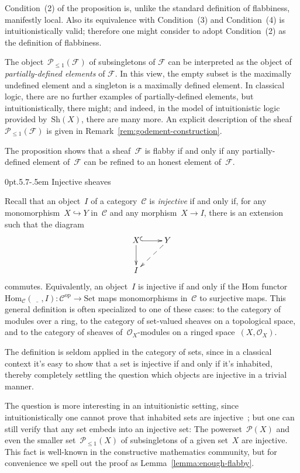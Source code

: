 \documentclass[10pt,reqno,a4paper]{amsbook}
\makeatletter
\theoremstyle{definition}
\theoremstyle{plain}
\theoremstyle{remark}
\newcommand{\C}{\mathcal{C}}
\newcommand{\F}{\mathcal{F}}
\renewcommand{\O}{\mathcal{O}}
\renewcommand{\P}{\mathcal{P}}
\newcommand{\Hom}{\mathrm{Hom}}
\newcommand{\placeholder}{\underline{\quad}}
\newcommand{\Set}{\mathrm{Set}}
\newcommand{\Sh}{\mathrm{Sh}}
\newcommand{\op}{\mathrm{op}}
\newcommand{\?}{\,{:}\,}
\renewcommand{\_}{\mathpunct{.}\,}
\def\subsection{\@startsection{subsection}{2}%
  {0pt}{.5\linespacing\@plus.7\linespacing}{-.5em}%
  {\normalfont\bfseries}}
\makeatother
\begin{document}
Condition~(2) of the proposition is, unlike the standard definition of flabbiness,
manifestly local. Also its equivalence with Condition~(3) and Condition~(4) is
intuitionistically valid; therefore one might consider to adopt Condition~(2) as
the definition of flabbiness.

The object~$\P_{\leq 1}(\F)$ of subsingletons of $\F$ can be
interpreted as the object of \emph{partially-defined
elements} of $\F$. In this view, the empty subset is the maximally undefined
element and a singleton is a maximally defined element. In classical logic,
there are no further examples of partially-defined elements, but
intuitionistically, there might; and indeed, in the model of intuitionistic
logic provided by~$\Sh(X)$, there are many more. An explicit description of the
sheaf~$\P_{\leq 1}(\F)$ is given in Remark~\ref{rem:godement-construction}.

The proposition shows that a sheaf~$\F$ is flabby if and only if any
partially-defined element of~$\F$ can be refined to an honest element of~$\F$.


\subsection{Injective sheaves}

Recall that an object~$I$ of a category~$\C$ is \emph{injective} if and only if,
for any monomorphism~$X \hookrightarrow Y$ in~$\C$ and any morphism~$X \to I$, there
is an extension such that the diagram
\[ \xymatrix{
  X \ar@{^{(}->}[r]\ar[d] & Y \ar@{-->}[dl] \\
  I
} \]
commutes. Equivalently, an object~$I$ is injective if and only if the Hom
functor~$\Hom_\C(\placeholder, I) : \C^\op \to \Set$ maps monomorphisms in~$\C$ to
surjective maps. This general definition is often specialized to one of these cases:
to the category of modules over a ring, to the category of set-valued sheaves
on a topological space, and to the category of sheaves of~$\O_X$-modules on a
ringed space~$(X,\O_X)$.

The definition is seldom applied in the category of sets, since in a classical
context it's easy to show that a set is injective if and only if it's
inhabited, thereby completely settling the question which objects are
injective in a trivial manner.

The question is more interesting in an intuitionistic setting, since
intuitionistically one cannot prove that inhabited sets are
injective~\cite{aczel-et-al:injective}; but one can still verify that any set embeds
into an injective set: The powerset~$\P(X)$ and even the smaller
set~$\P_{\leq1}(X)$ of subsingletons of a given set~$X$ are injective. This
fact is well-known in the constructive mathematics community, but for
convenience we spell out the proof as Lemma~\ref{lemma:enough-flabby}.
\end{document}
